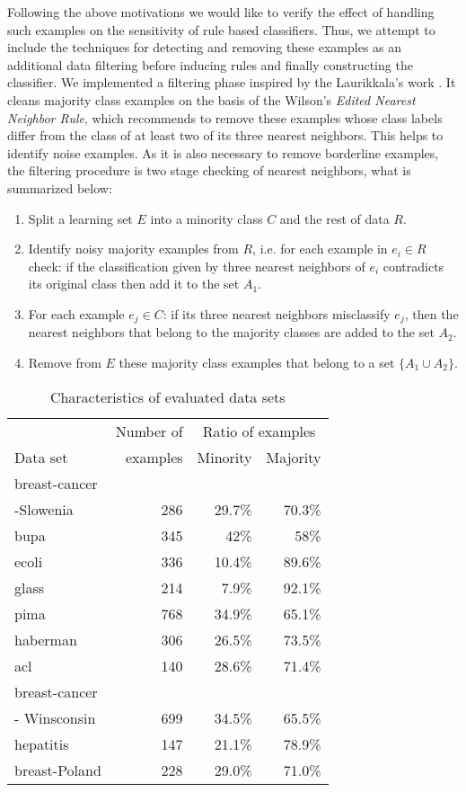\documentclass{AIMeth05}
\begin{document}
Following the above motivations we would like to verify the effect of
handling such examples on the sensitivity of rule based classifiers. Thus,
we attempt to include the techniques for detecting and removing these
examples as an additional data filtering before inducing rules and finally
constructing the classifier. We implemented a filtering phase inspired by
the Laurikkala's work \cite{Lav}. It cleans majority class examples on the
basis of  the Wilson's {\em Edited Nearest Neighbor Rule}, which recommends
to remove these examples whose class labels differ from the class of at
least two of its three nearest neighbors. This helps to identify noise
examples. As it is also necessary to  remove borderline examples, the
filtering procedure is two stage checking of nearest neighbors, what is
summarized below:
\begin{enumerate}
  \item Split a learning set $E$ into a minority class $C$ and the rest of
  data $R$.
  \item Identify noisy majority examples from $R$, i.e. for each example in $e_i \in
  R$ check:   if the classification given by three
  nearest neighbors of $e_i$ contradicts its original class then add it to the set
  $A_1$.
  \item For each example $e_j \in C$: if its three nearest neighbors
  misclassify $e_j$, then the nearest neighbors that  belong to the majority
  classes are added to the set $A_2$.
  \item Remove from $E$ these majority class examples that belong to a set
  $\{A_1 \cup A_2\}$.
\end{enumerate}



\begin{table}%
 \caption{Characteristics of evaluated data sets} \centering
\begin{tabular}{l@{\quad}r@{\quad}r@{\quad}r}
\noalign{\smallskip} \hline \noalign{\smallskip}
 & Number of  & \multicolumn{2}{c}{Ratio of examples} \\
 Data set & examples & Minority & Majority \\ \hline
 breast-cancer & & & \\
 -Slowenia & 286 & 29.7\% & 70.3\% \\
bupa & 345 & 42\% & 58\% \\
ecoli & 336 & 10.4\% & 89.6\% \\
glass & 214 & 7.9\% & 92.1\% \\
pima & 768 & 34.9\% & 65.1\% \\
haberman & 306 & 26.5\% & 73.5\% \\
 acl & 140 & 28.6\% & 71.4\%\\
 breast-cancer & & & \\
 - Winsconsin & 699 & 34.5\% & 65.5\%\\
hepatitis & 147 & 21.1\% & 78.9\% \\
breast-Poland & 228 & 29.0\% & 71.0\% \\ \hline
\end{tabular}
\label{tab:data_sets}
\end{table}
\end{document}
